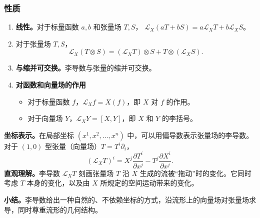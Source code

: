 \subsubsection{性质}
\begin{enumerate}
  \item \textbf{线性。}对于标量函数 $a,b$ 和张量场 $T,S$，
  $\mathcal L_X(aT+bS)=a\mathcal L_XT+b\mathcal L_XS$。
  \item 对于张量场 $T,S$，
  \[
    \mathcal L_X(T\otimes S)=(\mathcal L_XT)\otimes S+T\otimes(\mathcal L_X S).
  \]
  \item \textbf{与缩并可交换。}李导数与张量的缩并可交换。
  \item \textbf{对函数和向量场的作用}
  \begin{itemize}
    \item 对于标量函数 $f$，$\mathcal L_X f=X(f)$，即 $X$ 对 $f$ 的作用。
    \item 对于向量场 $Y$，$\mathcal L_XY=[X,Y]$，即 $X$ 和 $Y$ 的李括号。
  \end{itemize}
\end{enumerate}

\textbf{坐标表示。}在局部坐标 $(x^1,x^2,\ldots,x^n)$ 中，可以用偏导数表示张量场的李导数。对于 $(1,0)$ 型张量（向量场）$T=T^i\partial_i$，
\[
  (\mathcal L_X T)^i=X^j\frac{\partial T^i}{\partial x^j}
                   -T^j\frac{\partial X^i}{\partial x^j}.
\]
\textbf{直观理解。}李导数 $\mathcal L_XT$ 刻画张量场 $T$ 沿 $X$ 生成的流被“拖动”时的变化。它同时考虑 $T$ 本身的变化，以及由 $X$ 所规定的空间运动带来的变化。

\textbf{小结。}李导数给出一种自然的、不依赖坐标的方式，沿流形上的向量场对张量场求导，同时尊重流形的几何结构。
